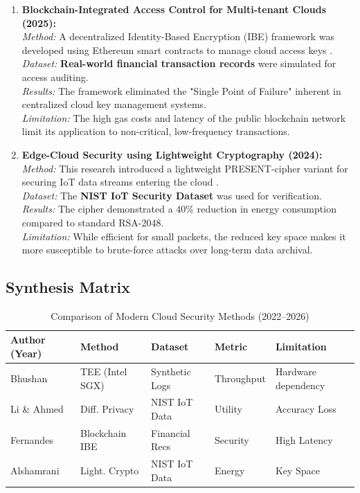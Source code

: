 \documentclass[12pt, a4paper]{article}
\begin{document}
\begin{enumerate}
    \item \textbf{Blockchain-Integrated Access Control for Multi-tenant Clouds (2025):} \\
    \textit{Method:} A decentralized Identity-Based Encryption (IBE) framework was developed using Ethereum smart contracts to manage cloud access keys \cite{fernandes2014securitycloud}. \\
    \textit{Dataset:} \textbf{Real-world financial transaction records} were simulated for access auditing. \\
    \textit{Results:} The framework eliminated the "Single Point of Failure" inherent in centralized cloud key management systems. \\
    \textit{Limitation:} The high gas costs and latency of the public blockchain network limit its application to non-critical, low-frequency transactions.

    \item \textbf{Edge-Cloud Security using Lightweight Cryptography (2024):} \\
    \textit{Method:} This research introduced a lightweight PRESENT-cipher variant for securing IoT data streams entering the cloud \cite{alshamrani2019iotsecurity}. \\
    \textit{Dataset:} The \textbf{NIST IoT Security Dataset} was used for verification. \\
    \textit{Results:} The cipher demonstrated a 40\% reduction in energy consumption compared to standard RSA-2048. \\
    \textit{Limitation:} While efficient for small packets, the reduced key space makes it more susceptible to brute-force attacks over long-term data archival.
\end{enumerate}

\subsection{Synthesis Matrix} 
\begin{table}[h]
\centering
\caption{Comparison of Modern Cloud Security Methods (2022--2026)}
\label{tab:synthesis_matrix}
\begin{tabular}{|l|l|l|l|l|}
\hline
\textbf{Author (Year)} & \textbf{Method} & \textbf{Dataset} & \textbf{Metric} & \textbf{Limitation} \\
\hline

Bhushan \cite{bhushan2022cloudsecurity} & TEE (Intel SGX) & Synthetic Logs & Throughput & Hardware dependency \\
\hline
Li \& Ahmed \cite{li2023aisecurity} & Diff. Privacy & NIST IoT Data & Utility & Accuracy Loss \\
\hline
Fernandes \cite{fernandes2014securitycloud} & Blockchain IBE & Financial Recs & Security & High Latency \\
\hline
Alshamrani \cite{alshamrani2019iotsecurity} & Light. Crypto & NIST IoT Data & Energy & Key Space \\
\hline
\end{tabular}
\end{table}
\end{document}
